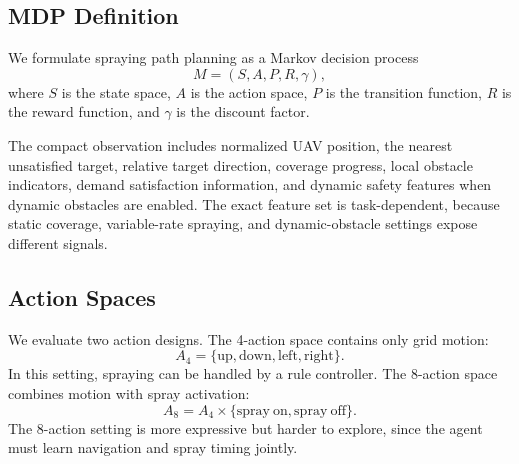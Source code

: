 \documentclass[conference,10pt]{IEEEtran}
\begin{document}
\begin{table}[t]
\centering
\caption{AAS-derived orchard planning environments.}
\label{tab:env_stats}
\end{table}

\subsection{MDP Definition}
We formulate spraying path planning as a Markov decision process
\begin{equation}
M = (S, A, P, R, \gamma),
\end{equation}
where $S$ is the state space, $A$ is the action space, $P$ is the transition function, $R$ is the reward function, and $\gamma$ is the discount factor.

The compact observation includes normalized UAV position, the nearest unsatisfied target, relative target direction, coverage progress, local obstacle indicators, demand satisfaction information, and dynamic safety features when dynamic obstacles are enabled. The exact feature set is task-dependent, because static coverage, variable-rate spraying, and dynamic-obstacle settings expose different signals.

\subsection{Action Spaces}
We evaluate two action designs. The 4-action space contains only grid motion:
\begin{equation}
A_4 = \{\mathrm{up}, \mathrm{down}, \mathrm{left}, \mathrm{right}\}.
\end{equation}
In this setting, spraying can be handled by a rule controller. The 8-action space combines motion with spray activation:
\begin{equation}
A_8 = A_4 \times \{\mathrm{spray\ on}, \mathrm{spray\ off}\}.
\end{equation}
The 8-action setting is more expressive but harder to explore, since the agent must learn navigation and spray timing jointly.
\end{document}
